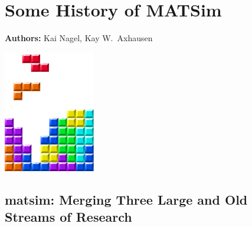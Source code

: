 \chapter{Some History of MATSim}
\label{ch:history}

\hfill \textbf{Authors:} Kai Nagel, Kay W.\ Axhausen

\begin{center} \includegraphics[width=0.3\textwidth, angle=0]{frontmatter/figures/MATSimBook.png} \end{center}

%
%


\section{\protect\gls{matsim}: Merging Three Large and Old Streams of Research}
\label{sec:streams}

